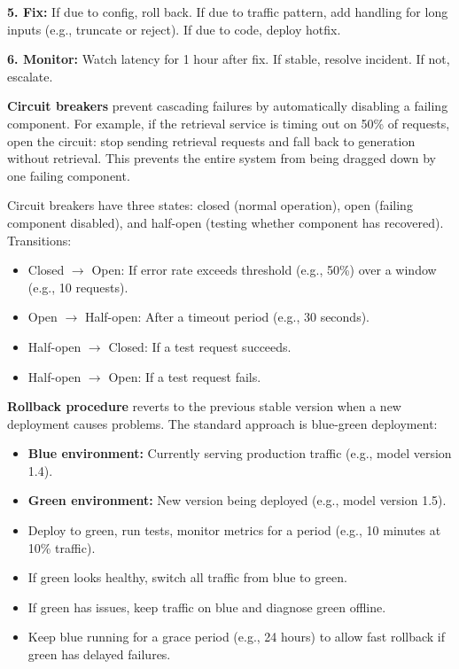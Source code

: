 \textbf{5. Fix:} If due to config, roll back. If due to traffic pattern, add handling for long inputs (e.g., truncate or reject). If due to code, deploy hotfix.

\textbf{6. Monitor:} Watch latency for 1 hour after fix. If stable, resolve incident. If not, escalate.

\vspace{0.5em}

\textbf{Circuit breakers} prevent cascading failures by automatically disabling a failing component. For example, if the retrieval service is timing out on 50\% of requests, open the circuit: stop sending retrieval requests and fall back to generation without retrieval. This prevents the entire system from being dragged down by one failing component.

Circuit breakers have three states: closed (normal operation), open (failing component disabled), and half-open (testing whether component has recovered). Transitions:

\begin{itemize}
\item Closed $\to$ Open: If error rate exceeds threshold (e.g., 50\%) over a window (e.g., 10 requests).
\item Open $\to$ Half-open: After a timeout period (e.g., 30 seconds).
\item Half-open $\to$ Closed: If a test request succeeds.
\item Half-open $\to$ Open: If a test request fails.
\end{itemize}


\textbf{Rollback procedure} reverts to the previous stable version when a new deployment causes problems. The standard approach is blue-green deployment:

\begin{itemize}
\item \textbf{Blue environment:} Currently serving production traffic (e.g., model version 1.4).
\item \textbf{Green environment:} New version being deployed (e.g., model version 1.5).
\item Deploy to green, run tests, monitor metrics for a period (e.g., 10 minutes at 10\% traffic).
\item If green looks healthy, switch all traffic from blue to green.
\item If green has issues, keep traffic on blue and diagnose green offline.
\item Keep blue running for a grace period (e.g., 24 hours) to allow fast rollback if green has delayed failures.
\end{itemize}

